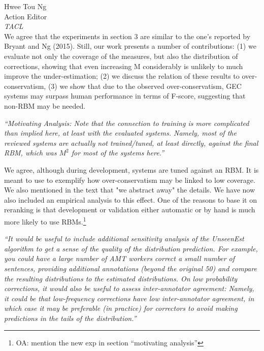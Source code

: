 \documentclass[11pt,letterpaper]{letter}
\newcommand{\oa}[1]{\footnote{\color{red}OA: #1}}
\begin{document}
\begin{letter}{%
Hwee Tou Ng\\
Action Editor\\
{\em TACL}\\
}
We agree that the experiments in section 3 are similar to the one's reported by Bryant and Ng (2015). Still, our work presents a number of contributions: (1) we evaluate not only the coverage of the measures, but also the distribution of corrections, showing that even increasing M considerably is unlikely to much improve the under-estimation; (2) we discuss the relation of these results to over-conservatism, (3) we show that due to the observed over-conservatism, GEC systems may surpass human performance in terms of F-score, suggesting that non-RBM may be needed.

\emph{``Motivating Analysis: Note that the connection to training is more
	complicated than implied here, at least with the evaluated systems. Namely,
	most of the reviewed systems are actually not trained/tuned, at least
	directly, against the final RBM, which was $M^2$ for most of the systems here.''
	}
	
	We agree, although during development, systems are tuned against an RBM. It is meant to use to exemplify how over-conservatism may be linked to low coverage. We also mentioned in the text that "we abstract away" the details. We have now also included an empirical analysis to this effect. One of the reasons to base it on reranking is that development or validation either automatic or by hand is much more likely to use RBMs.\oa{mention the new exp in section ``motivating analysis''}
	
	\emph{``It would be useful to include additional sensitivity analysis of the
		UnseenEst algorithm to get a sense of the quality of the distribution
		prediction. For example, you could have a large number of AMT workers
		correct a small number of sentences, providing additional annotations
		(beyond the original 50) and compare the resulting distributions to the
		estimated distributions. On low probability corrections, it would also be
		useful to assess inter-annotator agreement: Namely, it could be that
		low-frequency corrections have low inter-annotator agreement, in which case
		it may be preferable (in practice) for correctors to avoid making
		predictions in the tails of the distribution.''
		}
		

\end{letter}
\end{document}
